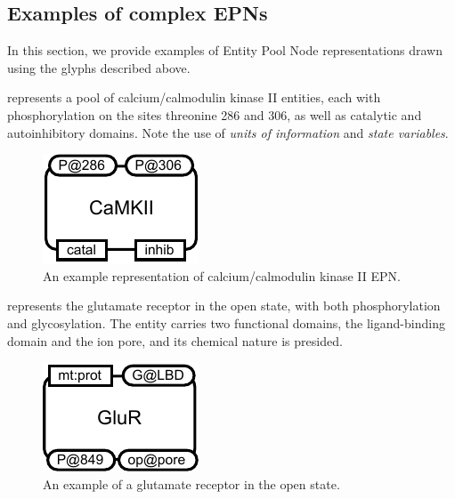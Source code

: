 
\subsection{Examples of complex EPNs}
\label{sec:CplxEPNs}

In this section, we provide examples of Entity Pool Node representations drawn using the \SBGNPDLone glyphs described above. 

 represents a pool of calcium/calmodulin kinase II entities, each with phosphorylation on the sites threonine 286 and 306, as well as catalytic and autoinhibitory domains.  Note the use of \emph{units of information} and \emph{state variables}.

\begin{figure}[H]
  \centering
  \includegraphics[scale = 0.8]{examples/macromolecule-CaMKII}
  \caption{An example representation of calcium/calmodulin kinase II EPN.}
  \label{fig:example-camkii}
\end{figure}

 represents the glutamate receptor in the open state, with both phosphorylation and glycosylation.  The entity carries two functional domains, the ligand-binding domain and the ion pore, and its chemical nature is presided.

\begin{figure}[H]
  \centering
  \includegraphics[scale = 0.8]{examples/macromolecule-GluR}
  \caption{An example of a glutamate receptor in the open state.}
  \label{fig:example-glur}
\end{figure}

